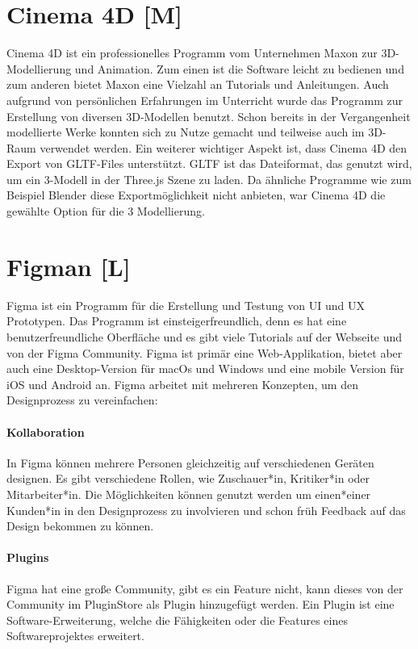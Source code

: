 \section{Cinema 4D [M]}
Cinema 4D ist ein professionelles Programm vom Unternehmen Maxon zur 3D-Modellierung und Animation. Zum einen ist die Software leicht zu bedienen und zum anderen bietet Maxon eine Vielzahl an Tutorials und Anleitungen. Auch aufgrund von persönlichen Erfahrungen im Unterricht wurde das Programm zur Erstellung von diversen 3D-Modellen benutzt. Schon bereits in der Vergangenheit modellierte Werke konnten sich zu Nutze gemacht und teilweise auch im 3D-Raum verwendet werden. Ein weiterer wichtiger Aspekt ist, dass Cinema 4D den Export von GLTF-Files unterstützt. GLTF ist das Dateiformat, das genutzt wird, um ein 3-Modell in der Three.js Szene zu laden. Da ähnliche Programme wie zum Beispiel Blender diese Exportmöglichkeit nicht anbieten, war Cinema 4D die gewählte Option für die 3 Modellierung. 
\cite{Cinema4D}
 
\section{Figman [L]}
\label{ch::technologies::figma}
Figma ist ein Programm für die Erstellung und Testung von UI und UX Prototypen. Das Programm ist einsteigerfreundlich, denn es hat eine benutzerfreundliche Oberfläche und es gibt viele Tutorials auf der Webseite und von der Figma Community. Figma ist primär eine Web-Applikation, bietet aber auch eine Desktop-Version für macOs und Windows und eine mobile Version für iOS und Android an. Figma arbeitet mit mehreren Konzepten, um den Designprozess zu vereinfachen:
\paragraph{Kollaboration}
In Figma können mehrere Personen gleichzeitig auf verschiedenen Geräten designen. Es gibt verschiedene Rollen, wie Zuschauer*in, Kritiker*in oder Mitarbeiter*in. Die Möglichkeiten können genutzt werden um einen*einer Kunden*in in den Designprozess zu involvieren und schon früh Feedback auf das Design bekommen zu können.
\paragraph{Plugins}
Figma hat eine große Community, gibt es ein Feature nicht, kann dieses von der Community im PluginStore als Plugin hinzugefügt werden. Ein Plugin ist eine Software-Erweiterung, welche die Fähigkeiten oder die Features eines Softwareprojektes erweitert.

